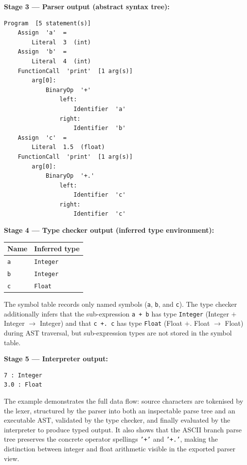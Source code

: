\textbf{Stage 3 --- Parser output (abstract syntax tree):}
\begin{lstlisting}
Program  [5 statement(s)]
    Assign  'a'  =
        Literal  3  (int)
    Assign  'b'  =
        Literal  4  (int)
    FunctionCall  'print'  [1 arg(s)]
        arg[0]:
            BinaryOp  '+'
                left:
                    Identifier  'a'
                right:
                    Identifier  'b'
    Assign  'c'  =
        Literal  1.5  (float)
    FunctionCall  'print'  [1 arg(s)]
        arg[0]:
            BinaryOp  '+.'
                left:
                    Identifier  'c'
                right:
                    Identifier  'c'
\end{lstlisting}

\textbf{Stage 4 --- Type checker output (inferred type environment):}

\begin{table}[H]
\centering
\small
\begin{tabular}{@{} ll @{}}
\toprule
\textbf{Name} & \textbf{Inferred type} \\
\midrule
\texttt{a}     & \texttt{Integer} \\
\texttt{b}     & \texttt{Integer} \\
\texttt{c}     & \texttt{Float} \\
\bottomrule
\end{tabular}
\end{table}

\noindent The symbol table records only named symbols (\texttt{a}, \texttt{b},
and \texttt{c}). The type checker additionally infers that the sub-expression
\texttt{a + b} has type \texttt{Integer} (Integer $+$ Integer $\rightarrow$
Integer) and that \texttt{c +. c} has type \texttt{Float} (Float $+.$ Float
$\rightarrow$ Float) during AST traversal, but sub-expression types are not
stored in the symbol table.

\textbf{Stage 5 --- Interpreter output:}
\begin{lstlisting}
7 : Integer
3.0 : Float
\end{lstlisting}

The example demonstrates the full data flow: source characters are tokenised by
the lexer, structured by the parser into both an inspectable parse tree and an
executable AST, validated by the type checker, and finally
evaluated by the interpreter to produce typed output. It also shows that the
ASCII branch parse tree preserves the concrete operator spellings
\texttt{'+'} and \texttt{'+.'}, making the distinction between integer and
float arithmetic visible in the exported parser view.


